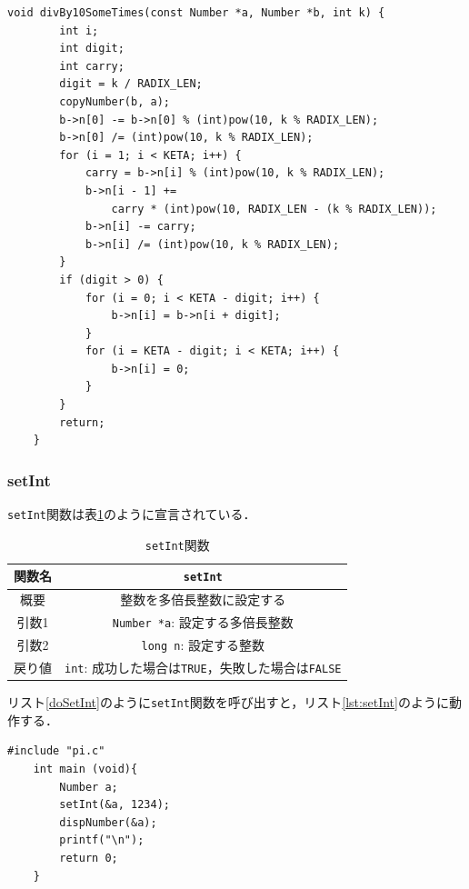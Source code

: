 \documentclass[a4paper,11pt,dvipdfmx]{jsarticle}
\begin{document}
\begin{lstlisting}[caption=divBy10SomeTimes関数,label=lst:divBy10SomeTimessrc]
    void divBy10SomeTimes(const Number *a, Number *b, int k) {
        int i;
        int digit;
        int carry;
        digit = k / RADIX_LEN;
        copyNumber(b, a);
        b->n[0] -= b->n[0] % (int)pow(10, k % RADIX_LEN);
        b->n[0] /= (int)pow(10, k % RADIX_LEN);
        for (i = 1; i < KETA; i++) {
            carry = b->n[i] % (int)pow(10, k % RADIX_LEN);
            b->n[i - 1] +=
                carry * (int)pow(10, RADIX_LEN - (k % RADIX_LEN));
            b->n[i] -= carry;
            b->n[i] /= (int)pow(10, k % RADIX_LEN);
        }
        if (digit > 0) {
            for (i = 0; i < KETA - digit; i++) {
                b->n[i] = b->n[i + digit];
            }
            for (i = KETA - digit; i < KETA; i++) {
                b->n[i] = 0;
            }
        }
        return;
    }
\end{lstlisting}

\subsubsection{setInt}
\texttt{setInt}関数は表\ref{table:lst:setInt}のように宣言されている．

\begin{table}[H]
\centering
\caption{\texttt{setInt}関数}
\label{table:lst:setInt}
\begin{tabular}{c||c}
\hline
関数名    & \texttt{setInt}   \\
\hline
概要    & 整数を多倍長整数に設定する   \\
\hline
引数1   & \texttt{Number *a}: 設定する多倍長整数  \\
引数2   & \texttt{long n}: 設定する整数  \\
\hline
戻り値    & \texttt{int}: 成功した場合は\texttt{TRUE}，失敗した場合は\texttt{FALSE}   \\
\hline
\end{tabular}
\end{table}

リスト\ref{doSetInt}のように\texttt{setInt}関数を呼び出すと，リスト\ref{lst:setInt}のように動作する．
\begin{lstlisting}[caption=\texttt{setInt}関数の呼び出し,label=doSetInt]
    #include "pi.c"
    int main (void){
        Number a;
        setInt(&a, 1234);
        dispNumber(&a);
        printf("\n");
        return 0;
    }
\end{lstlisting}
\end{document}
